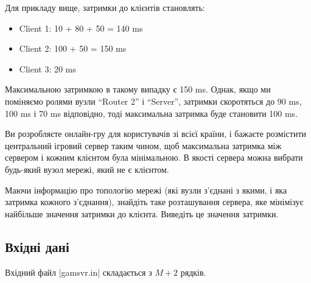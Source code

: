 \documentclass[12pt,a4paper]{article}
\begin{document}
Для прикладу вище, затримки до клієнтів становлять:
\begin{itemize}
    \item Client 1: 10 + 80 + 50 = 140 ms
    \item Client 2: 100 + 50 = 150 ms
    \item Client 3: 20 ms
\end{itemize}

Максимальною затримкою в такому випадку є 150 ms. Однак, якщо ми поміняємо ролями вузли ``Router 2'' і ``Server'', затримки скоротяться до 90 ms, 100 ms і 70 ms відповідно, тоді максимальна затримка буде становити 100 ms.

\begin{center}
    \footnotesize
\end{center}


Ви розробляєте онлайн-гру для користувачів зі всієї країни, і бажаєте розмістити центральний ігровий сервер таким чином, щоб максимальна затримка між сервером і кожним клієнтом була мінімальною. В якості сервера можна вибрати будь-який вузол мережі, який не є клієнтом.

Маючи інформацію про топологію мережі (які вузли з’єднані з якими, і яка затримка кожного з’єднання), знайдіть таке розташування сервера, яке мінімізує найбільше значення затримки до клієнта. Виведіть це значення затримки.


\subsection*{Вхідні дані}

Вхідний файл |gamsvr.in| складається з \(M + 2\) рядків.
\end{document}
